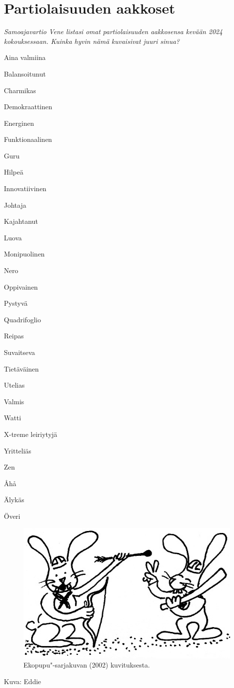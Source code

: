 \section{Partiolaisuuden aakkoset}

\textit{Samoajavartio Vene listasi omat partiolaisuuden aakkosensa kevään 
2024 kokouksessaan. Kuinka hyvin nämä kuvaisivat juuri sinua?}

\begin{multicols}{3}
\setlength{\parindent}{0em}\setlength{\parskip}{1.4em} {\large A}ina valmiina

{\large B}alansoitunut

{\large C}harmikas

{\large D}emokraattinen

{\large E}nerginen

{\large F}unktionaalinen

{\large G}uru

{\large H}ilpeä

{\large I}nnovatiivinen

{\large J}ohtaja

{\large K}ajahtanut

{\large L}uova

{\large M}onipuolinen

{\large N}ero

{\large O}ppivainen

{\large P}ystyvä

{\large Q}uadrifoglio

{\large R}eipas

{\large S}uvaitseva

{\large T}ietäväinen

{\large U}telias

{\large V}almis

{\large W}atti

{\large X}-treme leiriytyjä

{\large Y}ritteliäs

{\large Z}en

{\large Å}hå

{\large Ä}lykäs

{\large Ö}veri
\end{multicols}

\begin{figure}[!h]
\centering\includegraphics[width=.5\textwidth]{assets/pupu}
\caption{Ekopupu"-sarjakuvan (2002) kuvituksesta.}
\end{figure}

\medskip

\noindent\null\hfill Kuva: Eddie
